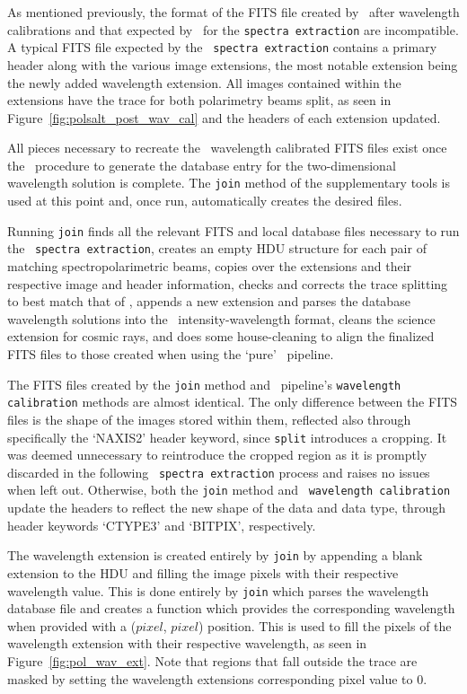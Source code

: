 As mentioned previously, the format of the \gls{FITS} file created by \iraf\ after wavelength calibrations and that expected by \polsalt\ for the \texttt{spectra extraction} are incompatible. A typical \gls{FITS} file expected by the \polsalt\ \texttt{spectra extraction} contains a primary header along with the various image extensions, the most notable extension being the newly added wavelength extension. All images contained within the extensions have the trace for both polarimetry beams split, as seen in Figure~\ref{fig:polsalt_post_wav_cal} and the headers of each extension updated.

All pieces necessary to recreate the \polsalt\ wavelength calibrated \gls{FITS} files exist once the \iraf\ procedure to generate the database entry for the two-dimensional wavelength solution is complete. The \texttt{join} method of the supplementary tools is used at this point and, once run, automatically creates the desired files.

Running \texttt{join} finds all the relevant \gls{FITS} and local database files necessary to run the \polsalt\ \texttt{spectra extraction}, creates an empty \gls{HDU} structure for each pair of matching spectropolarimetric beams, copies over the extensions and their respective image and header information, checks and corrects the trace splitting to best match that of \polsalt, appends a new extension and parses the database wavelength solutions into the \polsalt\ intensity-wavelength format, cleans the science extension for cosmic rays, and does some house-cleaning to align the finalized \gls{FITS} files to those created when using the `pure' \polsalt\ pipeline.

The \gls{FITS} files created by the \texttt{join} method and \polsalt\ pipeline's \texttt{wavelength calibration} methods are almost identical. The only difference between the \gls{FITS} files is the shape of the images stored within them, reflected also through specifically the `NAXIS2' header keyword, since \texttt{split} introduces a cropping. It was deemed unnecessary to reintroduce the cropped region as it is promptly discarded in the following \polsalt\ \texttt{spectra extraction} process and raises no issues when left out. Otherwise, both the \texttt{join} method and \polsalt\ \texttt{wavelength calibration} update the headers to reflect the new shape of the data and data type, through header keywords `CTYPE3' and `BITPIX', respectively.

The wavelength extension is created entirely by \texttt{join} by appending a blank extension to the \gls{HDU} and filling the image pixels with their respective wavelength value. This is done entirely by \texttt{join} which parses the wavelength database file and creates a function which provides the corresponding wavelength when provided with a ($pixel$, $pixel$) position. This is used to fill the pixels of the wavelength extension with their respective wavelength, as seen in Figure~\ref{fig:pol_wav_ext}. Note that regions that fall outside the trace are masked by setting the wavelength extensions corresponding pixel value to $0$.

